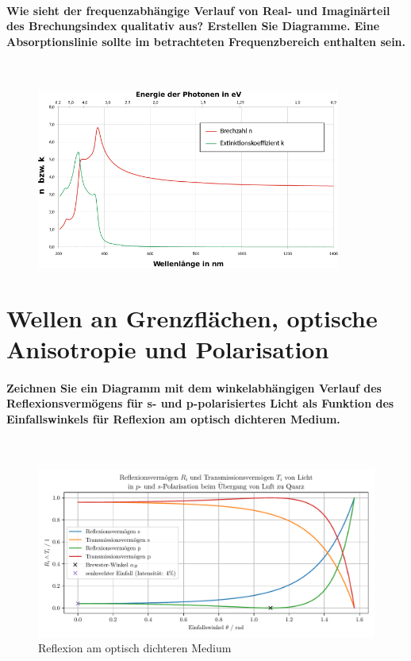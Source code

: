 \documentclass[a4paper, 11pt, ngerman, parskip=half-]{scrartcl}
\begin{document}
\paragraph{Wie sieht der frequenzabhängige Verlauf von Real- und Imaginärteil des Brechungsindex
    qualitativ aus? Erstellen Sie Diagramme. Eine Absorptionslinie sollte im betrachteten
    Frequenzbereich enthalten sein.} ~

\begin{figure}[H]
    \centering
    \includegraphics[width=10cm]{image/14/6}
\end{figure}

\newpage

\section{Wellen an Grenzflächen, optische Anisotropie und Polarisation}
\label{Wellen an Grenzflaechen, optische Anisotropie und Polarisation}

\paragraph{Zeichnen Sie ein Diagramm mit dem winkelabhängigen Verlauf des Reflexionsvermögens für s- und p-polarisiertes Licht als Funktion des Einfallswinkels für Reflexion am optisch dichteren Medium.}~

\begin{figure}[H]
    \centering
    \begin{samepage}
        \includegraphics[width=\textwidth]{image/15/Luft_zu_Quarz.pdf}
        \caption{Reflexion am optisch dichteren Medium}
        \label{fig:reflexion_dicht}
    \end{samepage}
\end{figure}
\end{document}
